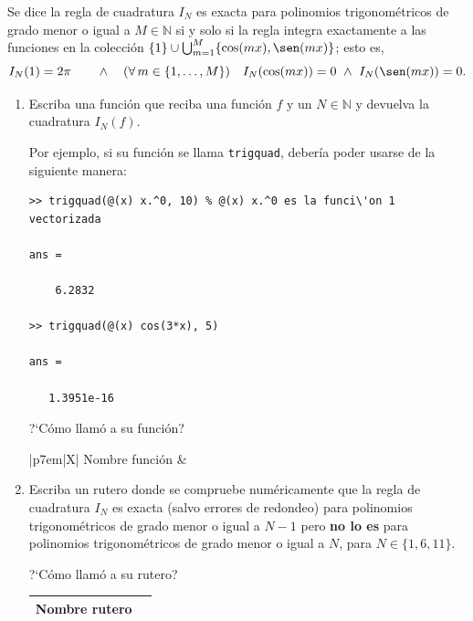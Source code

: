 \documentclass[legalpaper,11pt]{article}
\begin{document}
\begin{enumerate}
Se dice la regla de cuadratura $I_N$ es exacta para polinomios trigonom\'etricos de grado menor o igual a $M \in \mathbb{N}$ si y solo si la regla integra exactamente a las funciones en la colecci\'on $\{1\} \cup \bigcup_{m=1}^M \{ \cos(mx), \sen(mx) \}$; esto es,
%
\begin{equation*}
I_N(1) = 2\pi \qquad\wedge\quad (\forall\,m\in\{1,\dotsc,M\}) \quad I_N(\cos(mx)) = 0 \ \wedge\ I_N(\sen(mx)) = 0.
\end{equation*}

\begin{enumerate}
\item {} Escriba una funci\'on \matlab que reciba una funci\'on $f$ y un $N \in \mathbb{N}$ y devuelva la cuadratura $I_N(f)$.

Por ejemplo, si su funci\'on se llama \texttt{trigquad}, deber\'ia poder usarse de la siguiente manera:
\begin{lstlisting}
>> trigquad(@(x) x.^0, 10) % @(x) x.^0 es la funci\'on 1 vectorizada

ans =

    6.2832

>> trigquad(@(x) cos(3*x), 5)

ans =

   1.3951e-16
\end{lstlisting}

\medskip

?`C\'omo llam\'o a su funci\'on?

\begin{tabularx}{\linewidth}{|p{7em}|X|}\hline
Nombre funci\'on & \\\hline
\end{tabularx}

\medskip

\item {} Escriba un rutero \matlab donde se compruebe num\'ericamente que la regla de cuadratura $I_N$ es exacta (salvo errores de redondeo) para polinomios trigonom\'etricos de grado menor o igual a $N-1$ pero \textbf{no lo es} para polinomios trigonom\'etricos de grado menor o igual a $N$, para $N \in \{1, 6, 11\}$.

\medskip

?`C\'omo llam\'o a su rutero?

\begin{tabularx}{\linewidth}{|p{7em}|X|}\hline
Nombre rutero & \\\hline
\end{tabularx}
\end{enumerate}


\end{enumerate}
\end{document}
